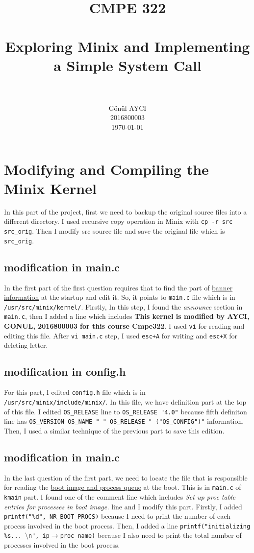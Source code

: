 \documentclass[paper=a4, fontsize=11pt]{scrartcl}
\title{
		\usefont{OT1}{bch}{b}{n}
		\normalfont \normalsize \textsc{CMPE 322} \\ [25pt]
		\horrule{0.5pt} \\[0.4cm]
		\huge Exploring Minix and Implementing a Simple System Call \\
		\horrule{2pt} \\[0.5cm]
}
\author{
		\normalfont 								\normalsize
        G\"{o}n\"{u}l AYCI\\2016800003\\[-3pt]		\normalsize
        \today
}
\date{}
\numberwithin{equation}{section}		%
\numberwithin{figure}{section}			%
\numberwithin{table}{section}				%
\begin{document}
\maketitle

\section{Modifying and Compiling the Minix Kernel }
In this part of the project, first we need to backup the original source files into a different directory.
I used recursive copy operation in Minix with \texttt{cp -r src src\_orig}. Then I modify src source file and save the original file which is \texttt{ src\_orig}.

\subsection{modification in main.c}
In the first part of the first question requires that to find the part of \underline{banner information} at the startup and edit it. So, it points to \texttt{main.c} file which is in \texttt{/usr/src/minix/kernel/}. Firstly, In this step, I found the \textit{announce} section in \texttt{main.c}, then I added a line which includes \textbf{This kernel is modified by AYCI, GONUL, 2016800003 for this course Cmpe322}. I used \texttt{vi} for reading and editing this file. After \texttt{vi main.c} step, I used \texttt{esc+A} for writing and \texttt{esc+X} for deleting letter.

\subsection{modification in config.h}
For this part, I edited \texttt{config.h} file which is in \texttt{/usr/src/minix/include/minix/}. In this file, we have definition part at the top of this file. I edited \texttt{OS\_RELEASE} line to \texttt{OS\_RELEASE "4.0"} because fifth definiton line has \texttt{OS\_VERSION OS\_NAME " " OS\_RELEASE " ("OS\_CONFIG")"} information. Then, I used a similar technique of the previous part to save this edition.

\subsection{modification in main.c}
In the last question of the first part, we need to locate the file that is responsible for reading the \underline{boot image and process queue} at the boot. This is in \texttt{main.c} of \texttt{kmain} part.
I found one of the comment line which includes \textit{Set up proc table entries for processes in boot image.} line and I modify this part. Firstly, I added \texttt{printf("\%d", NR\_BOOT\_PROCS)} because I need to print the number of each process involved in the boot process. Then, I added a line \texttt{printf("initializing \%s... $\setminus$n", ip$\rightarrow$proc\_name)} because I also need to print the total number of processes involved in the boot process.
\end{document}
